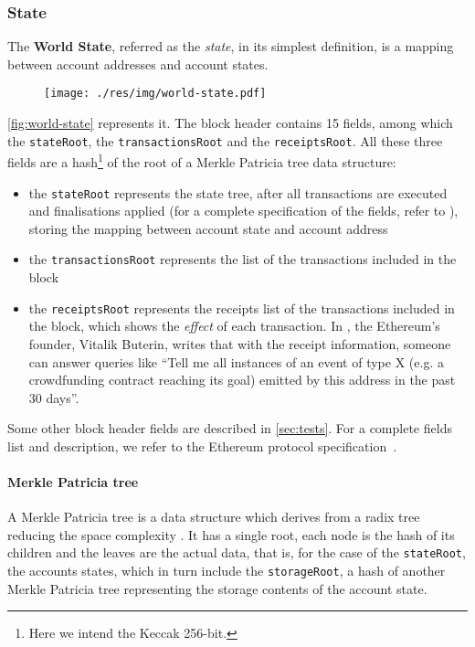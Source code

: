\subsubsection{State}
\label{sec:world-state}

The \textbf{World State}, referred as the \emph{state}, in its simplest
definition, is a mapping between account addresses and account states.

\begin{figure}[h]
  \centering
  \texttt{[image: ./res/img/world-state.pdf]}
\label{fig:world-state}
\end{figure}

\autoref{fig:world-state} represents it. The block header contains 15 fields,
among which the \verb+stateRoot+, the \verb+transactionsRoot+ and the
\verb+receiptsRoot+. All these three fields are a hash\footnote{Here we intend
the Keccak 256-bit.} of the root of a Merkle Patricia tree data structure:

\begin{itemize}
  \item the \verb+stateRoot+ represents the state tree, after all transactions
  are executed and finalisations applied (for a complete specification of the
  fields, refer to \cite{wood2018ethereum}), storing the mapping between account
  state and account address
  \item the \verb+transactionsRoot+ represents the list of the transactions included in
  the block
  \item the \verb+receiptsRoot+ represents the receipts list of the transactions
  included in the block, which shows the \emph{effect} of each transaction. In
  \cite{merklingethereum}, the Ethereum's founder, Vitalik Buterin,
  writes that with the receipt information, someone can answer queries like
  ``Tell me all instances of an event of type X (e.g. a crowdfunding contract
  reaching its goal) emitted by this address in the past 30 days''.
\end{itemize}

Some other block header fields are described in \autoref{sec:tests}. For a
complete fields list and description, we refer to the Ethereum protocol
specification~\cite{wood2018ethereum}.

\paragraph{Merkle Patricia tree} A Merkle Patricia tree is a data structure
which derives from a radix tree reducing the space complexity
\cite{patriciatree}. It has a single root, each node is the hash of its children
and the leaves are the actual data, that is, for the case of the
\verb+stateRoot+, the accounts states, which in turn include the
\verb+storageRoot+, a hash of another Merkle Patricia tree representing the
storage contents of the account state.

